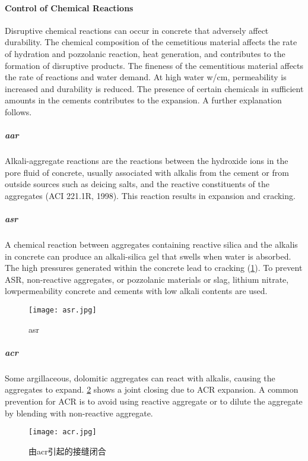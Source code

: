 \paragraph{Control of Chemical Reactions}
Disruptive chemical reactions can occur in concrete that adversely affect durability. The chemical composition of
the cemetitious material affects the rate of hydration and pozzolanic reaction, heat generation, and contributes to the
formation of disruptive products. The fineness of the cementitious material affects the rate of reactions and water
demand. At high water w/cm, permeability is increased and durability is reduced. The presence of certain chemicals
in sufficient amounts in the cements contributes to the expansion. A further explanation follows.

\subparagraph{\acrfull*{aar}}
Alkali-aggregate reactions are the reactions between the hydroxide ions in the pore fluid of concrete, usually
associated with alkalis from the cement or from outside sources such as deicing salts, and the reactive constituents of
the aggregates (ACI 221.1R, 1998). This reaction results in expansion and cracking.
\subparagraph{\acrfull*{asr}}
A chemical reaction between aggregates containing reactive silica and the alkalis in concrete can produce an
alkali-silica gel that swells when water is absorbed. The high pressures generated within the concrete lead to
cracking (\cref{fig:asr}). To prevent ASR, non-reactive aggregates, or pozzolanic materials or slag, lithium nitrate, lowpermeability
concrete and cements with low alkali contents are used.

\begin{figure}
  \texttt{[image: asr.jpg]}
  \caption{\acrlong*{asr}}
  \label{fig:asr}
\end{figure}

\subparagraph{\acrfull*{acr}}
Some argillaceous, dolomitic aggregates can react with alkalis, causing the aggregates to expand. \cref{fig:acr}
shows a joint closing due to ACR expansion. A common prevention for ACR is to avoid using reactive aggregate or
to dilute the aggregate by blending with non-reactive aggregate.

\begin{figure}
  \texttt{[image: acr.jpg]}
  \caption{由\acrlong*{acr}引起的接缝闭合}
  \label{fig:acr}
\end{figure}

